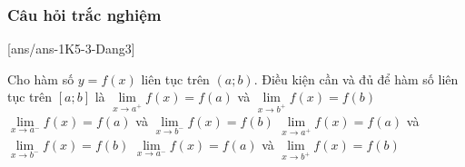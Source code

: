 \subsubsection{Câu hỏi trắc nghiệm}
[ans/ans-1K5-3-Dang3]
\begin{ex}%
	Cho hàm số $y=f\left( x \right)$ liên tục trên $(a;b)$. Điều kiện cần và đủ để hàm số liên tục trên $\left[ a;b \right]$ là
	\choice
	{$\lim\limits_{x\to {a^{+}}} f\left( x \right)=f\left( a \right)$ và $\lim\limits_{x\to {b^{+}}} f\left( x \right)=f\left( b \right)$}
	{$\lim\limits_{x\to {a^{-}}} f\left( x \right)=f\left( a \right)$ và $\lim\limits_{x\to {b^{-}}} f\left( x \right)=f\left( b \right)$}
	{\True $\lim\limits_{x\to {a^{+}}} f\left( x \right)=f\left( a \right)$ và $\lim\limits_{x\to {b^{-}}} f\left( x \right)=f\left( b \right)$}
	{$\lim\limits_{x\to {a^{-}}} f\left( x \right)=f\left( a \right)$ và $\lim\limits_{x\to {b^{+}}} f\left( x \right)=f\left( b \right)$}
\end{ex}

